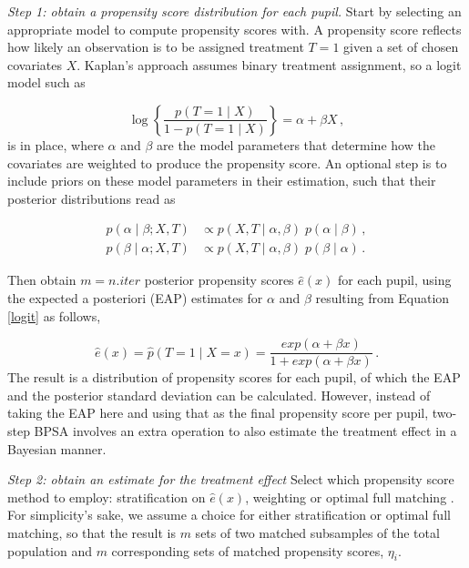 \documentclass{article}
\begin{document}
\textit{Step 1: obtain a propensity score distribution for each pupil.} \newline
Start by selecting an appropriate model to compute propensity scores with. A propensity score reflects how likely an observation is to be assigned treatment $T=1$ given a set of chosen covariates $X$. Kaplan's approach assumes binary treatment assignment, so a logit model such as

\begin{equation} \label{logit}
 \log \left\{ \frac{p(T = 1 \mid X)}{1 - p(T = 1 \mid X)} \right\} = \alpha + \beta X\,,
 \end{equation}
is in place, where $\alpha$ and $\beta$ are the model parameters that determine how the covariates are weighted to produce the propensity score. An optional step is to include priors on these model parameters in their estimation, such that their posterior distributions read as 

\begin{equation}
\begin{split}
 p(\alpha \mid \beta; X, T) & \propto p(X, T \mid \alpha, \beta) \; p(\alpha \mid \beta)\,,\\ 
 p(\beta \mid \alpha; X, T) & \propto p(X, T \mid \alpha, \beta) \; p(\beta \mid \alpha)\,. 
\end{split}
\end{equation}

Then obtain $m = n.iter$ posterior propensity scores $\hat{e}(x)$ for each pupil, using the expected a posteriori (EAP) estimates for $\alpha$ and $\beta$ resulting from Equation \eqref{logit} as follows, 

\begin{equation} \label{pps}
 \hat{e}(x) = \hat{p}(T = 1 \mid X = x) = \frac{exp(\alpha + \beta x)}{1 + exp(\alpha + \beta x)}\,.
 \end{equation}
The result is a distribution of propensity scores for each pupil, of which the EAP and the posterior standard deviation can be calculated. However, instead of taking the EAP here and using that as the final propensity score per pupil, two-step BPSA involves an extra operation to also estimate the treatment effect in a Bayesian manner. \newline

\textit{Step 2: obtain an estimate for the treatment effect}\newline
Select which propensity score method to employ: stratification on $\hat{e}(x)$, weighting or optimal full matching \parencite{cochran1968effectiveness,hirano2001estimation,hansen2006optimal}. For simplicity's sake, we assume a choice for either stratification or optimal full matching, so that the result is $m$ sets of two matched subsamples of the total population and $m$ corresponding sets of matched propensity scores, $\eta_i$.
\end{document}
